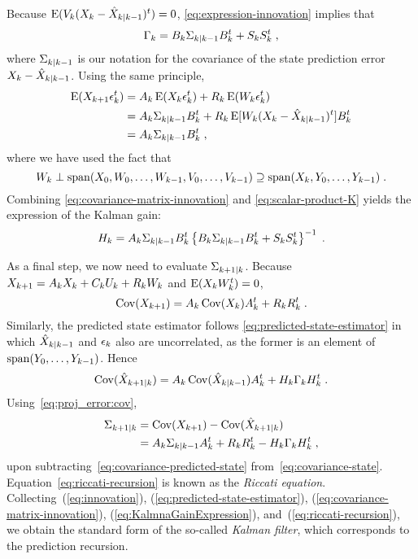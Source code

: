 Because $\operatorname{E}(V_k (X_k - \hat{X}_{k|k-1})^t)= 0$, \eqref{eq:expression-innovation} implies that
\begin{equation}
\label{eq:covariance-matrix-innovation}
  \ICov_k= \B_k \postcov{k}{k-1} \B_k^t + \VCov[k] \eqsp ,
\end{equation}
where $\Sigma_{k|k-1}$ is our notation for the covariance of the state
prediction error $X_k - \hat{X}_{k|k-1}$. Using the same principle,
\begin{align}
\nonumber \operatorname{E}(X_{k+1} \epsilon_k^t) & = A_k \operatorname{E}(X_k \epsilon_k^t) + R_k \operatorname{E}(W_k \epsilon_k^t) \\
\nonumber & = A_k \Sigma_{k|k-1} B_k^t + R_k \operatorname{E}[W_k(X_k - \hat{X}_{k|k-1})^t] B_k^t \\
\label{eq:scalar-product-K} & = A_k \Sigma_{k|k-1} B_k^t \; ,
\end{align}
where we have used the fact that
$$
W_k \perp \operatorname{span}(X_0, W_0, \ldots, W_{k-1}, V_0, \ldots, V_{k-1})
\supseteq \operatorname{span} (X_k, Y_0, \ldots, Y_{k-1}) \;.
$$
Combining \eqref{eq:covariance-matrix-innovation} and \eqref{eq:scalar-product-K} yields the expression of the Kalman gain:
\begin{equation}
  \label{eq:KalmnaGainExpression}
  \KGP{k}= \A_k \postcov{k}{k-1} \B_k^t \left \{ \B_k \postcov{k}{k-1} \B_k^t + \VCov[k] \right\}^{-1} \eqsp .
\end{equation}

As a final step, we now need to evaluate $\Sigma_{k+1|k}$. Because $X_{k+1} = A_k X_k + C_k U_k + R_k W_k$ and $\operatorname{E}(X_k W_k^t) = 0$,
\begin{equation}
  \label{eq:covariance-state}
  \operatorname{Cov}(X_{k+1})= A_k \operatorname{Cov}(X_k) A_k^t + R_k R_k^t \; .
\end{equation}
Similarly, the predicted state estimator follows
\eqref{eq:predicted-state-estimator} in which $\hat{X}_{k|k-1}$ and $\epsilon_k$
also are uncorrelated, as the former is an element of $\operatorname{span}(Y_0, \dots,
Y_{k-1})$. Hence
\begin{equation}
\label{eq:covariance-predicted-state}
\operatorname{Cov}( \hat{X}_{k+1|k}) = A_k \operatorname{Cov}(\hat{X}_{k|k-1}) A_k^t + H_{k} \Gamma_k H_{k}^t \; .
\end{equation}
Using~\eqref{eq:proj_error:cov},
\begin{align}
  \Sigma_{k+1|k} & = \operatorname{Cov}(X_{k+1}) - \operatorname{Cov}( \hat{X}_{k+1|k}) \nonumber \\
 \label{eq:riccati-recursion} & = A_k \Sigma_{k|k-1} A_k^t + R_k R_k^t - H_{k} \Gamma_k H_{k}^t \; ,
\end{align}
upon subtracting~\eqref{eq:covariance-predicted-state}
from~\eqref{eq:covariance-state}. Equation~\eqref{eq:riccati-recursion} is known as
the  {\em Riccati equation}. Collecting~(\ref{eq:innovation}),
(\ref{eq:predicted-state-estimator}), (\ref{eq:covariance-matrix-innovation}),
(\ref{eq:KalmnaGainExpression}), and~(\ref{eq:riccati-recursion}), we obtain the
standard form of the so-called {\em Kalman filter}, which corresponds to the
prediction recursion.

